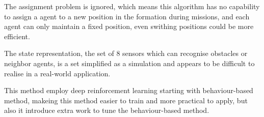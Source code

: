 \begin{compactenum}
	\item The assignment problem is ignored, which means this algorithm has no capability to assign a agent to a new position in the formation during missions, and each agent can only maintain a fixed position, even swithing positions could be more efficient.
	\item The state representation, the set of 8 sensors which can recognise obstacles or neighbor agents, is a set simplified as a simulation and appears to be difficult to realise in a real-world application.
	\item This method employ deep reinforcement learning starting with behaviour-based method, makeing this method easier to train and more practical to apply, but also it introduce extra work to tune the behaviour-based method.
\end{compactenum}

